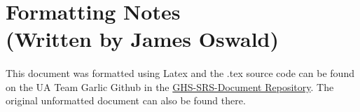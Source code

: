 \documentclass[]{article}
\begin{document}
\section{Formatting Notes \\ (Written by James Oswald)}
\paragraph{}
This document was formatted using Latex and the .tex source code can be found on the UA Team Garlic Github in the \href{https://github.com/UAlbany-Team-Garlic/GHS-SRS-Document}{GHS-SRS-Document Repository}. The original unformatted document can also be found there.
\end{document}
